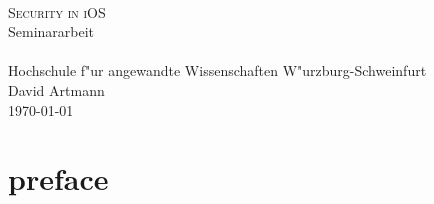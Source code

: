 \documentclass[12pt,a4paper]{scrartcl}
\begin{document}
	

\begin{titlepage}
   	\mbox{}\vspace{5\baselineskip}\\
   	\rmfamily\huge
   	\centering
	\textsc{Security in iOS}
	\\[3ex]
   	Seminararbeit
   	\rmfamily\Large
   	\vspace{1\baselineskip}\\
   	\mbox{}
	\vspace{3\baselineskip}\\
	Hochschule f"ur angewandte Wissenschaften W"urzburg-Schweinfurt
   	\vspace{5\baselineskip}\\
   	\rmfamily\Large
   	David Artmann
   	\vspace{1\baselineskip}\\
   	\today
\end{titlepage}

	\tableofcontents
	\newpage
	
	\listoffigures
	\newpage
	
	\section*{preface}
	\newpage
	
\end{document}
